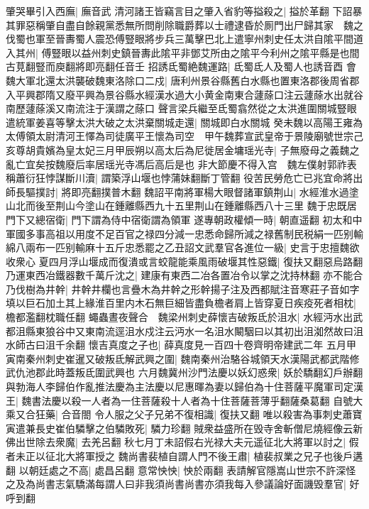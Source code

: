 肇哭畢引入西廡|{
	廡音武}
清河諸王皆竊言目之肇入省豹等搤殺之|{
	搤於革翻}
下詔暴其罪惡稱肇自盡自餘親黨悉無所問削除職爵葬以士禮逮昏於厠門出尸歸其家　魏之伐蜀也軍至晉夀蜀人震恐傅豎眼將步兵三萬擊巴北上遣寧州刺史任太洪自隂平間道入其州|{
	傅豎眼以益州刺史鎮晉夀此隂平非鄧艾所由之隂平今利州之隂平縣是也間古莧翻豎而庾翻將即亮翻任音壬}
招誘氐蜀絶魏運路|{
	氐蜀氐人及蜀人也誘音酉}
會魏大軍北還太洪襲破魏東洛除口二戍|{
	唐利州景谷縣舊白水縣也置東洛郡後周省郡入平興郡隋又廢平興為景谷縣水經漢水過大小黄金南東合蘧蒢口注云蘧蒢水出就谷南歷蘧蒢溪又南流注于漢謂之蒢口}
聲言梁兵繼至氐蜀翕然從之太洪進圍關城豎眼遣統軍姜喜等擊太洪大破之太洪棄關城走還|{
	關城即白水關城}
癸未魏以高陽王雍為太傅領太尉清河王懌為司徒廣平王懷為司空　甲午魏葬宣武皇帝于景陵廟號世宗己亥尊胡貴嬪為皇太妃三月甲辰朔以高太后為尼徙居金墉瑶光寺|{
	子無廢母之義魏之亂亡宜矣按魏廢后率居瑶光寺馮后高后是也}
非大節慶不得入宫　魏左僕射郭祚表稱蕭衍狂悖謀斷川瀆|{
	謂築浮山堰也悖蒲妹翻斷丁管翻}
役苦民勞危亡已兆宜命將出師長驅撲討|{
	將即亮翻撲普木翻}
魏詔平南將軍楊大眼督諸軍鎮荆山|{
	水經淮水過塗山北而後至荆山今塗山在鍾離縣西九十五里荆山在鍾離縣西八十三里}
魏于忠既居門下又總宿衛|{
	門下謂為侍中宿衛謂為領軍}
遂專朝政權傾一時|{
	朝直遥翻}
初太和中軍國多事高祖以用度不足百官之禄四分減一忠悉命歸所減之禄舊制民税絹一匹别輸綿八兩布一匹别輸麻十五斤忠悉罷之乙丑詔文武羣官各進位一級|{
	史言于忠擅魏欲收衆心}
夏四月浮山堰成而復潰或言蛟龍能乘風雨破堰其性惡鐵|{
	復扶又翻惡烏路翻}
乃運東西冶鐵器數千萬斤沈之|{
	建康有東西二冶各置冶令以掌之沈持林翻}
亦不能合乃伐樹為井幹|{
	井幹井欄也言疊木為井幹之形幹揚子注及西都賦注音寒莊子音如字}
填以巨石加土其上緣淮百里内木石無巨細皆盡負檐者肩上皆穿夏日疾疫死者相枕|{
	檐都濫翻枕職任翻}
蠅蟲晝夜聲合　魏梁州刺史薛懷吉破叛氐於沮水|{
	水經沔水出武都沮縣東狼谷中又東南流逕沮水戍注云沔水一名沮水闞駰曰以其初出沮洳然故曰沮水師古曰沮千余翻}
懷吉真度之子也|{
	薛真度見一百四十卷齊明帝建武二年}
五月甲寅南秦州刺史崔暹又破叛氐解武興之圍|{
	魏南秦州治駱谷城領天水漢陽武都武階修武仇池郡此時蓋叛氐圍武興也}
六月魏冀州沙門法慶以妖幻惑衆|{
	妖於驕翻幻戶辦翻}
與勃海人李歸伯作亂推法慶為主法慶以尼惠暉為妻以歸伯為十住菩薩平魔軍司定漢王|{
	魏書法慶以殺一人者為一住菩薩殺十人者為十住菩薩菩薄乎翻薩桑葛翻}
自號大乘又合狂藥|{
	合音閤}
令人服之父子兄弟不復相識|{
	復扶又翻}
唯以殺害為事刺史蕭寶寅遣兼長史崔伯驎擊之伯驎敗死|{
	驎力珍翻}
賊衆益盛所在毁寺舍斬僧尼燒經像云新佛出世除去衆魔|{
	去羌呂翻}
秋七月丁未詔假右光禄大夫元遥征北大將軍以討之|{
	假者未正以征北大將軍授之}
魏尚書裴植自謂人門不後王肅|{
	植裴叔業之兄子也後戶遘翻}
以朝廷處之不高|{
	處昌呂翻}
意常怏怏|{
	怏於兩翻}
表請解官隱嵩山世宗不許深怪之及為尚書志氣驕滿每謂人曰非我須尚書尚書亦須我每入參議論好面譏毁羣官|{
	好呼到翻}
